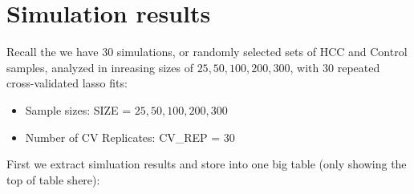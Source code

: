 \documentclass[
]{book}
\begin{document}
\hypertarget{simulation-results}{%
\section{Simulation results}\label{simulation-results}}

Recall the we have \(30\) simulations, or randomly selected sets of HCC and Control samples,
analyzed in inreasing sizes of \(25, 50, 100, 200, 300\), with
\(30\) repeated cross-validated lasso fits:

\begin{itemize}
\item
  Sample sizes: SIZE = \(25, 50, 100, 200, 300\)
\item
  Number of CV Replicates: CV\_REP = \(30\)
\end{itemize}

First we extract simluation results and store into one big table (only showing the top of table shere):
\end{document}
